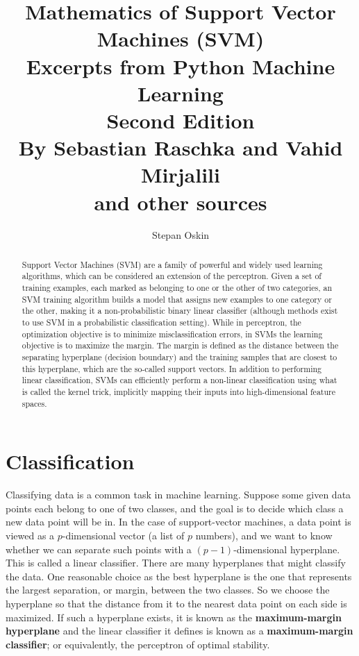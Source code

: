 \documentclass[11pt]{article}
\begin{document}
    \title{Mathematics of Support Vector Machines (SVM) \\
    Excerpts from Python Machine Learning \\
    Second Edition \\
    By Sebastian Raschka and Vahid Mirjalili\cite{RaschkaMirjalili2017} \\
    and other sources}

    \author{Stepan Oskin}

    \maketitle

    \begin{abstract}

        Support Vector Machines (SVM) are a family of powerful and widely used learning algorithms,
        which can be considered an extension of the perceptron.
        Given a set of training examples, each marked as belonging to one or the other of two categories,
        an SVM training algorithm builds a model that assigns new examples to one category or the other,
        making it a non-probabilistic binary linear classifier (although methods exist to use SVM in
        a probabilistic classification setting).
        While in perceptron, the optimization objective is to minimize misclassification errors,
        in SVMs the learning objective is to maximize the margin.
        The margin is defined as the distance between the separating hyperplane (decision boundary)
        and the training samples that are closest to this hyperplane, which are the so-called support vectors.
        In addition to performing linear classification, SVMs can efficiently perform a non-linear classification
        using what is called the kernel trick, implicitly mapping their inputs into high-dimensional feature spaces.

    \end{abstract}

    \section{Classification} \label{sec:classification}

    Classifying data is a common task in machine learning.
    Suppose some given data points each belong to one of two classes, and the goal is to decide which class a
    new data point will be in.
    In the case of support-vector machines, a data point is viewed as a $p$-dimensional vector
    (a list of $p$ numbers), and we want to know whether we can separate such points with
    a $(p-1)$-dimensional hyperplane.
    This is called a linear classifier.
    There are many hyperplanes that might classify the data.
    One reasonable choice as the best hyperplane is the one that represents the largest separation, or margin,
    between the two classes.
    So we choose the hyperplane so that the distance from it to the nearest data point on each side is maximized.
    If such a hyperplane exists, it is known as the \textbf{maximum-margin hyperplane} and the linear classifier it defines
    is known as a \textbf{maximum-margin classifier};
    or equivalently, the perceptron of optimal stability.
\end{document}
